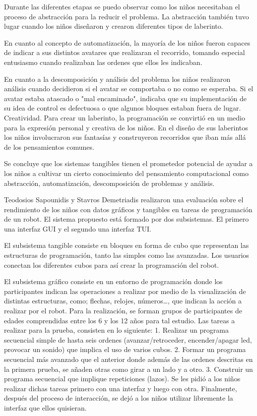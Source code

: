 Durante las diferentes etapas se puedo observar como los niños necesitaban el proceso de abstracción para la reducir el problema. La abstracción también tuvo lugar cuando los niños diseñaron y crearon diferentes tipos de laberinto. 

En cuanto al concepto de automatización, la mayoría de los niños fueron capaces de indicar a sus distintos avatares que realizaran el recorrido, tomando especial entusiasmo cuando realizaban las ordenes que ellos les indicaban. 

En cuanto a la descomposición y análisis del problema los niños realizaron análisis cuando decidieron si el avatar se comportaba o no como se esperaba. Si el avatar estaba atascado o "mal encaminado", indicaba que su implementación de su idea de control es defectuosa o que algunos bloques estaban fuera de lugar. Creatividad. Para crear un laberinto, la programación se convirtió en un medio para la expresión personal y creativa de los niños. En el diseño de sus laberintos los niños involucraron sus fantasías y construyeron recorridos que iban más allá de los pensamientos comunes.

Se concluye que los sistemas tangibles tienen el prometedor potencial de ayudar a los niños a cultivar un cierto conocimiento del pensamiento computacional como abstracción, automatización, descomposición de problemas y análisis.

Teodosios Sapounidis y Stavros Demetriadis \cite{Sapounidis} realizaron una evaluación sobre el rendimiento de los niños con datos gráficos y tangibles en tareas de programación de un robot. El sistema propuesto está formado por dos subsistemas. El primero una interfaz GUI y el segundo una interfaz TUI.

El subsistema tangible consiste en bloques en forma de cubo que representan las estructuras de programación, tanto las simples como las avanzadas. Los usuarios conectan los diferentes cubos para así crear la programación del robot.

El subsistema gráfico consiste en un entorno de programación donde los participantes indican las operaciones a realizar por medio de la visualización de distintas estructuras, como; flechas, relojes, números…, que indican la acción a realizar por el robot.
Para la realización, se forman grupos de participantes de edades comprendidas entre los 6 y los 12 años para tal estudio.
Las tareas a realizar para la prueba, consisten en lo siguiente:
1. Realizar un programa secuencial simple de hasta seis ordenes (avanzar/retroceder, encender/apagar led, provocar un sonido) que implica el uso de varios cubos.
2. Formar un programa secuencial más avanzado que el anterior donde además de las ordenes descritas en la primera prueba, se añaden otras como girar a un lado y a otro.
3. Construir un programa secuencial que implique repeticiones (lazos).
Se les pidió a los niños realizar dichas tareas primero con una interfaz y luego con otra. Finalmente, después del proceso de interacción, se dejó a los niños utilizar libremente la interfaz que ellos quisieran. 

